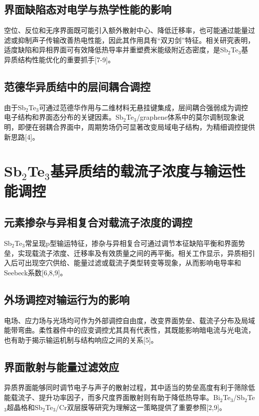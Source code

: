 \documentclass[12pt,a4paper]{ctexart}
\begin{document}
\subsection{界面缺陷态对电学与热学性能的影响}
空位、反位和无序界面既可能引入额外散射中心、降低迁移率，也可能通过能量过滤或抑制声子传输改善热电性能，因此其作用具有“双刃剑”特征。相关研究表明，适度缺陷和异相界面可有效降低热导率并重塑费米能级附近态密度，是Sb$_2$Te$_3$基异质结构性能优化的重要抓手[7-9]。

\subsection{范德华异质结中的层间耦合调控}
由于Sb$_2$Te$_3$可通过范德华作用与二维材料无悬挂键集成，层间耦合强弱成为调控电子结构和界面态分布的关键因素。Sb$_2$Te$_3$/graphene体系中的莫尔调制现象说明，即便在弱耦合界面中，周期势场仍可显著改变局域电子结构，为精细调控提供新思路[4]。

\section{\texorpdfstring{Sb$_2$Te$_3$}{Sb2Te3}基异质结的载流子浓度与输运性能调控}

\subsection{元素掺杂与异相复合对载流子浓度的调控}
Sb$_2$Te$_3$常呈现p型输运特征，掺杂与异相复合可通过调节本征缺陷平衡和界面势垒，实现载流子浓度、迁移率及有效质量之间的再平衡。相关工作显示，异质相引入后可出现空穴供给、能量过滤或载流子类型转变等现象，从而影响电导率和Seebeck系数[6,8,9]。

\subsection{外场调控对输运行为的影响}
电场、应力场与光场均可作为外部调控自由度，改变界面势垒、载流子分布及局域能带弯曲。柔性器件中的应变调控尤其具有代表性，其既能影响暗电流与光电流，也有助于揭示输运机制与结构响应之间的关系[5]。

\subsection{界面散射与能量过滤效应}
异质界面能够同时调节电子与声子的散射过程，其中适当的势垒高度有利于筛除低能载流子、提升功率因子，而多尺度界面散射则有助于降低热导率。Bi$_2$Te$_3$/Sb$_2$Te$_3$超晶格和Sb$_2$Te$_3$/Cr双层膜等研究为理解这一策略提供了重要参照[2,9]。
\end{document}
